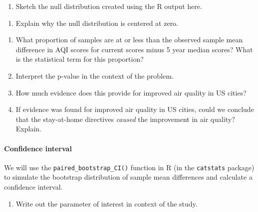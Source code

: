 \documentclass[
]{report}
\providecommand{\tightlist}{%
  \setlength{\itemsep}{0pt}\setlength{\parskip}{0pt}}
\begin{document}
\begin{enumerate}
\def\labelenumi{\arabic{enumi}.}
\setcounter{enumi}{9}
\tightlist
\item
  Sketch the null distribution created using the R output here.
\end{enumerate}

\vspace{1.8in}

\begin{enumerate}
\def\labelenumi{\arabic{enumi}.}
\setcounter{enumi}{10}
\tightlist
\item
  Explain why the null distribution is centered at zero.
\end{enumerate}

\vspace{.5in}

\begin{enumerate}
\def\labelenumi{\arabic{enumi}.}
\setcounter{enumi}{11}
\item
  What proportion of samples are at or less than the observed sample mean difference in AQI scores for current scores minus 5 year median scores? What is the statistical term for this proportion?
  \vspace{.3in}
\item
  Interpret the p-value in the context of the problem.
  \vspace{.8in}
\item
  How much evidence does this provide for improved air quality in US cities?
  \vspace{.3in}
\item
  If evidence was found for improved air quality in US cities, could we conclude that the stay-at-home directives \emph{caused} the improvement in air quality? Explain.
  \vspace{.5in}
\end{enumerate}

\hypertarget{confidence-interval}{%
\paragraph*{Confidence interval}\label{confidence-interval}}

We will use the \texttt{paired\_bootstrap\_CI()} function in R (in the \texttt{catstats} package) to simulate the bootstrap distribution of sample mean differences and calculate a confidence interval.

\begin{enumerate}
\def\labelenumi{\arabic{enumi}.}
\setcounter{enumi}{15}
\tightlist
\item
  Write out the parameter of interest in context of the study.
\end{enumerate}
\end{document}
